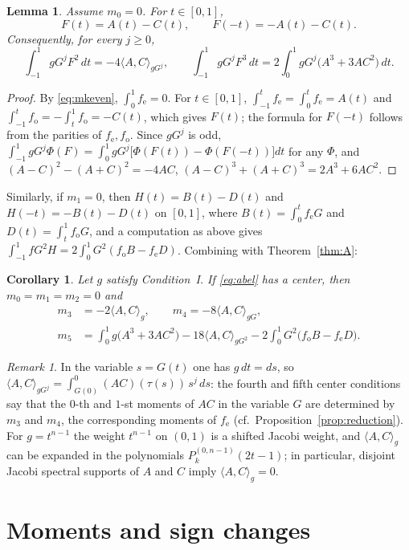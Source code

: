 \documentclass[11pt]{amsart}
\numberwithin{equation}{section}
\theoremstyle{plain}
\newtheorem{lemma}[theorem]{Lemma}
\newtheorem{corollary}[theorem]{Corollary}
\theoremstyle{definition}
\theoremstyle{remark}
\newtheorem{remark}[theorem]{Remark}
\newcommand{\fe}{f_{\mathrm e}}
\newcommand{\fo}{f_{\mathrm o}}
\newcommand{\ip}[2]{\langle #1,#2\rangle}
\begin{document}
\begin{lemma}\label{lem:parity}
Assume $m_0=0$. For $t\in[0,1]$,
\[
 F(t)=A(t)-C(t),\qquad F(-t)=-A(t)-C(t).
\]
Consequently, for every $j\ge0$,
\[
 \int_{-1}^1gG^jF^2\,dt=-4\ip{A}{C}_{gG^j},\qquad
 \int_{-1}^1gG^jF^3\,dt=2\int_0^1gG^j\bigl(A^3+3AC^2\bigr)\,dt .
\]
\end{lemma}

\begin{proof}
By \eqref{eq:mkeven}, $\int_0^1\fe=0$. For $t\in[0,1]$,
$\int_{-1}^t\fe=\int_0^t\fe=A(t)$ and $\int_{-1}^t\fo=-\int_t^1\fo=-C(t)$, which
gives $F(t)$; the formula for $F(-t)$ follows from the parities of $\fe,\fo$.
Since $gG^j$ is odd,
$\int_{-1}^1gG^j\Phi(F)=\int_0^1gG^j\bigl[\Phi(F(t))-\Phi(F(-t))\bigr]dt$ for any
$\Phi$, and $(A-C)^2-(A+C)^2=-4AC$, $(A-C)^3+(A+C)^3=2A^3+6AC^2$.
\end{proof}

Similarly, if $m_1=0$, then $H(t)=B(t)-D(t)$ and $H(-t)=-B(t)-D(t)$ on $[0,1]$,
where $B(t)=\int_0^t\fe G$ and $D(t)=\int_t^1\fo G$, and a computation as above
gives $\int_{-1}^1fG^2H=2\int_0^1G^2(\fo B-\fe D)$. Combining with
Theorem~\ref{thm:A}:

\begin{corollary}\label{cor:parity}
Let $g$ satisfy Condition~I. If \eqref{eq:abel} has a center, then
$m_0=m_1=m_2=0$ and
\begin{align*}
 m_3&=-2\ip{A}{C}_g,\qquad m_4=-8\ip{A}{C}_{gG},\\
 m_5&=\int_0^1g\bigl(A^3+3AC^2\bigr)-18\ip{A}{C}_{gG^2}
 -2\int_0^1G^2\bigl(\fo B-\fe D\bigr).
\end{align*}
\end{corollary}

\begin{remark}
In the variable $s=G(t)$ one has $g\,dt=ds$, so
$\ip{A}{C}_{gG^j}=\int_{G(0)}^0(AC)(\tau(s))\,s^j\,ds$: the fourth and fifth center
conditions say that the $0$-th and $1$-st moments of $AC$ in the variable $G$ are
determined by $m_3$ and $m_4$, the corresponding moments of $\fe$
(cf.\ Proposition~\ref{prop:reduction}). For $g=t^{n-1}$ the weight $t^{n-1}$ on
$(0,1)$ is a shifted Jacobi weight, and $\ip{A}{C}_g$ can be expanded in the
polynomials $P^{(0,n-1)}_k(2t-1)$; in particular, disjoint Jacobi spectral supports
of $A$ and $C$ imply $\ip{A}{C}_g=0$.
\end{remark}

\section{Moments and sign changes}\label{sec:moments}
\end{document}
